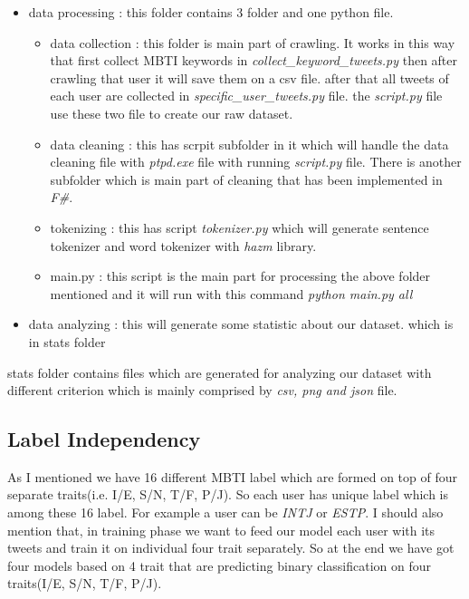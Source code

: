 \documentclass[10pt, a4paper]{article}
\begin{document}
\begin{itemize}
    \item data processing : this folder contains 3 folder and one python file.
          \begin{itemize}
              \item data collection : this folder is main part of crawling. It works in this way that first collect MBTI keywords in \textit{collect\_keyword\_tweets.py} then after crawling that user
                    it will save them on a csv file. after that all tweets of each user are collected in \textit{specific\_user\_tweets.py} file. the \textit{script.py}
                    file use these two file to create our raw dataset.
              \item data cleaning : this has scrpit subfolder in it which will handle the data cleaning file with \textit{ptpd.exe} file with running \textit{script.py} file. There is another subfolder which is main part of cleaning that has been implemented in \textit{F\#}.
              \item tokenizing : this has script \textit{tokenizer.py} which will generate sentence tokenizer and word tokenizer with \textit{hazm} library.
              \item main.py : this script is the main part for processing the above folder mentioned and it will run with this command \textit{python main.py all}
          \end{itemize}
    \item data analyzing : this will generate some statistic about our dataset. which is in stats folder
\end{itemize}
stats folder contains files which are generated for analyzing our dataset with different criterion which is mainly comprised by \textit{csv, png and json} file.
\subsection{Label Independency}
As I mentioned we have 16 different MBTI label which are formed on top of four separate traits(i.e. I/E, S/N, T/F, P/J).
So each user has unique label which is among these 16 label. For example a user can be \textit{INTJ} or \textit{ESTP}. I should also
mention that, in training phase we want to feed our model each user with its tweets and train it on individual four trait separately.
So at the end we have got four models based on 4 trait that are predicting binary classification on four traits(I/E, S/N, T/F, P/J).
\end{document}
